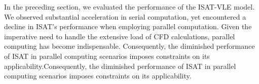 
In the preceding section, we evaluated the performance of the ISAT-VLE model. We observed substantial acceleration in serial computation, yet encountered a decline in ISAT's performance when employing parallel computation. Given the imperative need to handle the extensive load of CFD calculations, parallel computing has become indispensable. Consequently, the diminished performance of ISAT in parallel computing scenarios imposes constraints on its applicability.Consequently, the diminished performance of ISAT in parallel computing scenarios imposes constraints on its applicability.

